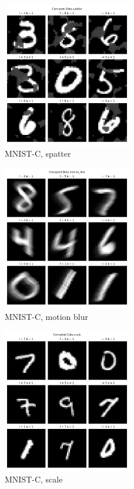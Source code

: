 \begin{figure}[htbp]
    \centerline{\includegraphics[width=0.5\textwidth]{resources/corrupted_data_spatter.png}}
    \caption{MNIST-C, spatter}\label{fig6}
\end{figure}

\begin{figure}[htbp]
    \centerline{\includegraphics[width=0.5\textwidth]{resources/corrupted_data_motion_blur.png}}
    \caption{MNIST-C, motion blur}\label{fig7}
\end{figure}

\begin{figure}[htbp]
    \centerline{\includegraphics[width=0.5\textwidth]{resources/corrupted_data_scale.png}}
    \caption{MNIST-C, scale}\label{fig8}   
\end{figure}


